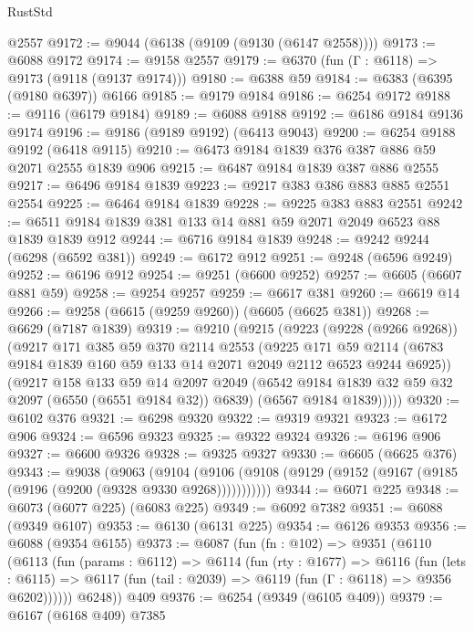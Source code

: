 \begin{lexlean}{RustStd}
\begin{coremodule}
    @2557
@9172 := @9044 (@6138 (@9109 (@9130 (@6147 @2558))))
@9173 := @6088 @9172
@9174 := @9158 @2557
@9179 := @6370 (fun (Γ : @6118) => @9173 (@9118 (@9137 @9174)))
@9180 := @6388 @59
@9184 := @6383 (@6395 (@9180 @6397)) @6166
@9185 := @9179 @9184
@9186 := @6254 @9172
@9188 := @9116 (@6179 @9184)
@9189 := @6088 @9188
@9192 := @6186 @9184 @9136 @9174
@9196 := @9186 (@9189 @9192) (@6413 @9043)
@9200 := @6254 @9188 @9192 (@6418 @9115)
@9210 := @6473 @9184 @1839 @376 @387 @886 @59 @2071 @2555 @1839 @906
@9215 := @6487 @9184 @1839 @387 @886 @2555
@9217 := @6496 @9184 @1839
@9223 := @9217 @383 @386 @883 @885 @2551 @2554
@9225 := @6464 @9184 @1839
@9228 := @9225 @383 @883 @2551
@9242 := @6511 @9184 @1839 @381 @133 @14 @881 @59 @2071 @2049 @6523 @88 @1839 @1839 @912
@9244 := @6716 @9184 @1839
@9248 := @9242 @9244 (@6298 (@6592 @381))
@9249 := @6172 @912
@9251 := @9248 (@6596 @9249)
@9252 := @6196 @912
@9254 := @9251 (@6600 @9252)
@9257 := @6605 (@6607 @881 @59)
@9258 := @9254 @9257
@9259 := @6617 @381
@9260 := @6619 @14
@9266 := @9258 (@6615 (@9259 @9260)) (@6605 (@6625 @381))
@9268 := @6629 (@7187 @1839)
@9319 := @9210
    (@9215
      (@9223
        (@9228 (@9266 @9268))
        (@9217
          @171
          @385
          @59
          @370
          @2114
          @2553
          (@9225
            @171
            @59
            @2114
            (@6783 @9184 @1839 @160 @59 @133 @14 @2071 @2049 @2112 @6523 @9244 @6925))
          (@9217
            @158
            @133
            @59
            @14
            @2097
            @2049
            (@6542 @9184 @1839 @32 @59 @32 @2097 (@6550 (@6551 @9184 @32)) @6839)
            (@6567 @9184 @1839)))))
@9320 := @6102 @376
@9321 := @6298 @9320
@9322 := @9319 @9321
@9323 := @6172 @906
@9324 := @6596 @9323
@9325 := @9322 @9324
@9326 := @6196 @906
@9327 := @6600 @9326
@9328 := @9325 @9327
@9330 := @6605 (@6625 @376)
@9343 := @9038
    (@9063
      (@9104 (@9106 (@9108 (@9129 (@9152 (@9167 (@9185 (@9196 (@9200 (@9328 @9330 @9268)))))))))))
@9344 := @6071 @225
@9348 := @6073 (@6077 @225) (@6083 @225)
@9349 := @6092 @7382
@9351 := @6088 (@9349 @6107)
@9353 := @6130 (@6131 @225)
@9354 := @6126 @9353
@9356 := @6088 (@9354 @6155)
@9373 := @6087
    (fun (fn : @102) =>
    @9351
      (@6110
        (@6113
          (fun (params : @6112) =>
          @6114
            (fun (rty : @1677) =>
            @6116
              (fun (lets : @6115) =>
              @6117 (fun (tail : @2039) => @6119 (fun (Γ : @6118) => @9356 @6202))))))
        @6248))
    @409
@9376 := @6254 (@9349 (@6105 @409))
@9379 := @6167 (@6168 @409) @7385

\end{coremodule}
\end{lexlean}
